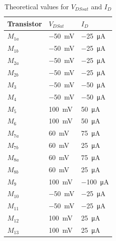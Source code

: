 \begin{table}[H]
    \centering
    \caption{Theoretical values for $V_{DSsat}$ and $I_D$}
    \begin{tabularx}{\textwidth}{>{\centering\arraybackslash}X >{\centering\arraybackslash}X >{\centering\arraybackslash}X}
        \toprule
        \textbf{Transistor} & \textbf{$V_{DSat}$} & \textbf{$I_D$}\\
        \midrule
        $M_{1a}$ & \SI{-50}{\milli\volt} & \SI{-25}{\micro\ampere}\\
        \midrule
        $M_{1b}$ & \SI{-50}{\milli\volt} & \SI{-25}{\micro\ampere}\\
        \midrule
        $M_{2a}$ & \SI{-50}{\milli\volt} & \SI{-25}{\micro\ampere}\\
        \midrule
        $M_{2b}$ & \SI{-50}{\milli\volt} & \SI{-25}{\micro\ampere}\\
        \midrule
        $M_{3}$ & \SI{-50}{\milli\volt} & \SI{-50}{\micro\ampere}\\
        \midrule
        $M_{4}$ & \SI{-50}{\milli\volt} & \SI{-50}{\micro\ampere}\\
        \midrule
        $M_{5}$ & \SI{100}{\milli\volt} & \SI{50}{\micro\ampere}\\
        \midrule
        $M_{6}$ & \SI{100}{\milli\volt} & \SI{50}{\micro\ampere}\\
        \midrule
        $M_{7a}$ & \SI{60}{\milli\volt} & \SI{75}{\micro\ampere}\\
        \midrule
        $M_{7b}$ & \SI{60}{\milli\volt} & \SI{25}{\micro\ampere}\\
        \midrule
        $M_{8a}$ & \SI{60}{\milli\volt} & \SI{75}{\micro\ampere}\\
        \midrule
        $M_{8b}$ & \SI{60}{\milli\volt} & \SI{25}{\micro\ampere}\\
        \midrule
        $M_{9}$ & \SI{100}{\milli\volt} & \SI{-100}{\micro\ampere}\\
        \midrule
        $M_{10}$ & \SI{-50}{\milli\volt} & \SI{-25}{\micro\ampere}\\
        \midrule
        $M_{11}$ & \SI{-50}{\milli\volt} & \SI{-25}{\micro\ampere}\\
        \midrule
        $M_{12}$ & \SI{100}{\milli\volt} & \SI{25}{\micro\ampere}\\
        \midrule
        $M_{13}$ & \SI{100}{\milli\volt} & \SI{25}{\micro\ampere}\\
        \bottomrule
    \end{tabularx}
    \label{tab:TeoVDSsatId}
\end{table}
